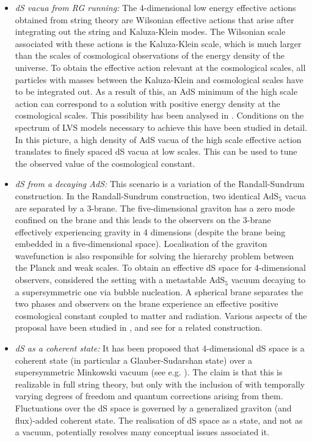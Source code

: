 \begin{itemize}
 \item{\it dS vacua from RG running:} The 4-dimensional low energy effective actions obtained from string theory are Wilsonian effective actions that arise after integrating out the string and Kaluza-Klein modes. The Wilsonian scale associated with these actions is the Kaluza-Klein scale,
 which is much larger than the scales of cosmological observations of the energy density of the universe. To obtain the effective
 action relevant at the cosmological scales, all particles with masses between the Kaluza-Klein and cosmological scales have to be integrated 
 out. As a result of this, an AdS minimum of the high scale action can correspond to a solution with positive energy density at the cosmological scales.
 This possibility has been analysed in \cite{deAlwis:2021zab, DeAlwis:2021gou}.  Conditions on the spectrum of LVS models
 necessary to achieve this have been  studied in detail. In this picture, a high density of AdS vacua of the high scale effective action 
 translates to  finely spaced dS vacua at low scales. This can be used to tune the observed value of the cosmological constant.
 
 
 
 \item{\it dS from a decaying AdS:} This scenario is a variation of the Randall-Sundrum construction. In the 
 Randall-Sundrum construction, two identical AdS$_5$ vacua are separated by a 3-brane. The five-dimensional graviton has a zero mode confined on the brane and this leads to the observers on the 3-brane effectively experiencing gravity in 4 dimensions (despite the brane being embedded in a five-dimensional space). Localisation of the graviton wavefunction is also responsible for solving the hierarchy problem between the Planck and weak scales. To obtain an effective dS space for 4-dimensional observers, \cite{Banerjee:2018qey, Banerjee:2019fzz} considered the setting with a metastable AdS$_5$ vacuum decaying to a supersymmetric one via bubble nucleation.  A spherical brane separates the two phases and observers on the brane experience  an effective positive cosmological constant coupled to matter and radiation. Various aspects of the proposal have been studied in \cite{Banerjee:2019fzz}, and see \cite{Berglund:2021xlm} for a related construction.  
 
 
\item{\it dS as a coherent state:} It has been proposed that 4-dimensional dS space is a coherent state (in particular a Glauber-Sudarshan state) over a supersymmetric Minkowski vacuum (see e.g. \cite{Brahma:2020htg, Bernardo:2021rul}).  The claim is that this is realizable in full string theory, but only with the inclusion of with temporally varying degrees of freedom and quantum corrections arising from them.  Fluctuations over the dS space is governed by a generalized graviton (and flux)-added coherent state. The realisation of dS space as a state, and not as a vacuum, potentially resolves many conceptual issues associated it. 
\ei




\end{itemize}
